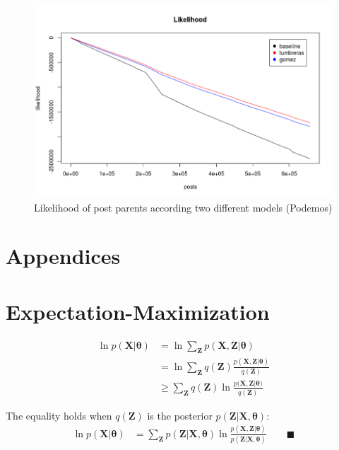 \documentclass[smallextended]{svjour3}          %
\begin{document}
\begin{figure}
\center
\includegraphics[width=1\textwidth]{predictions_likelihood_podemos}
\caption{Likelihood of post parents according two different models (Podemos)}
\end{figure}

\newpage
\appendix
\section*{Appendices}
\section{Expectation-Maximization}

\begin{align}
\ln p(\mathbf{X} | \boldsymbol{\theta}) &=  \ln \sum_{\mathbf{Z}}  p(\mathbf{X}, \mathbf{Z}  | \boldsymbol{\theta}) \\
&=\ln \sum_{\mathbf{Z}} q(\mathbf{Z}) \frac{p(\mathbf{X}, \mathbf{Z}  | \boldsymbol{\theta})}{ q(\mathbf{Z})}\\
&\geq \sum_{\mathbf{Z}} q(\mathbf{Z}) \ln \frac{p(\mathbf{X}, \mathbf{Z} | \boldsymbol{\theta)}}{q(\mathbf{Z})}
\end{align}


The equality holds when $q(\mathbf{Z})$ is the posterior $p(\mathbf{Z} | \mathbf{X}, \boldsymbol{\theta})$:
\begin{align}
\ln p(\mathbf{X} | \boldsymbol{\theta}) &=  \sum_{\mathbf{Z}} p(\mathbf{Z} | \mathbf{X}, \boldsymbol{\theta}) \ln \frac{p(\mathbf{X, Z} | \boldsymbol{\theta})}{ p(\mathbf{Z} | \mathbf{X}, \boldsymbol{\theta})} \qquad \blacksquare
\label{eq:em_general}
\end{align}
 

\end{document}
